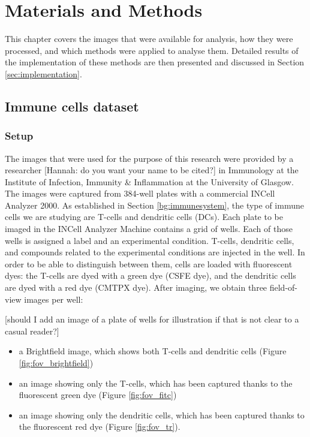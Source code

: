 \chapter{Materials and Methods} \label{sec:mm}

This chapter covers the images that were available for analysis, how they were processed, and which methods were applied to analyse them. Detailed results of the implementation of these methods are then presented and discussed in Section \ref{sec:implementation}.

\section{Immune cells dataset}

\subsection{Setup}

The images that were used for the purpose of this research were provided by a researcher [Hannah: do you want your name to be cited?] in Immunology at the Institute of Infection, Immunity \& Inflammation at the University of Glasgow. The images were captured from 384-well plates with a commercial INCell Analyzer 2000. As established in Section \ref{bg:immunesystem}, the type of immune cells we are studying are T-cells and dendritic cells (DCs). Each plate to be imaged in the INCell Analyzer Machine contains a grid of wells. Each of those wells is assigned a label and an experimental condition. T-cells, dendritic cells, and compounds related to the experimental conditions are injected in the well. In order to be able to distinguish between them, cells are loaded with fluorescent dyes: the T-cells are dyed with a green dye (CSFE dye), and the dendritic cells are dyed with a red dye (CMTPX dye). After imaging, we obtain three field-of-view images per well:

[should I add an image of a plate of wells for illustration if that is not clear to a casual reader?]

\begin{itemize}
    \item a Brightfield image, which shows both T-cells and dendritic cells (Figure \ref{fig:fov_brightfield})
    \item an image showing only the T-cells, which has been captured thanks to the fluorescent green dye (Figure \ref{fig:fov_fitc})
    \item an image showing only the dendritic cells, which has been captured thanks to the fluorescent red dye (Figure \ref{fig:fov_tr}).
\end{itemize}


